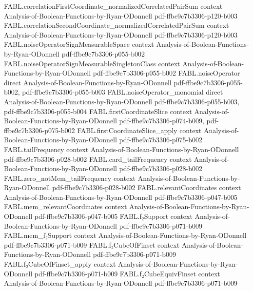 \begin{theorem}
\proofstep
  {FABL.correlationFirstCoordinate_normalizedCorrelatedPairSum}
  {context}
  {Analysis-of-Boolean-Functions-by-Ryan-ODonnell}
  {pdf-ffbe9c7b3306-p120-b003}
\proofstep
  {FABL.correlationSecondCoordinate_normalizedCorrelatedPairSum}
  {context}
  {Analysis-of-Boolean-Functions-by-Ryan-ODonnell}
  {pdf-ffbe9c7b3306-p120-b003}
\proofstep
  {FABL.noiseOperatorSignMeasurableSpace}
  {context}
  {Analysis-of-Boolean-Functions-by-Ryan-ODonnell}
  {pdf-ffbe9c7b3306-p055-b002}
\proofstep
  {FABL.noiseOperatorSignMeasurableSingletonClass}
  {context}
  {Analysis-of-Boolean-Functions-by-Ryan-ODonnell}
  {pdf-ffbe9c7b3306-p055-b002}
\proofstep
  {FABL.noiseOperator}
  {direct}
  {Analysis-of-Boolean-Functions-by-Ryan-ODonnell}
  {pdf-ffbe9c7b3306-p055-b002,
    pdf-ffbe9c7b3306-p055-b003}
\proofstep
  {FABL.noiseOperator_monomial}
  {direct}
  {Analysis-of-Boolean-Functions-by-Ryan-ODonnell}
  {pdf-ffbe9c7b3306-p055-b003,
    pdf-ffbe9c7b3306-p055-b004}
\proofstep
  {FABL.firstCoordinateSlice}
  {context}
  {Analysis-of-Boolean-Functions-by-Ryan-ODonnell}
  {pdf-ffbe9c7b3306-p074-b009,
    pdf-ffbe9c7b3306-p075-b002}
\proofstep
  {FABL.firstCoordinateSlice_apply}
  {context}
  {Analysis-of-Boolean-Functions-by-Ryan-ODonnell}
  {pdf-ffbe9c7b3306-p075-b002}
\proofstep
  {FABL.tailFrequency}
  {context}
  {Analysis-of-Boolean-Functions-by-Ryan-ODonnell}
  {pdf-ffbe9c7b3306-p028-b002}
\proofstep
  {FABL.card_tailFrequency}
  {context}
  {Analysis-of-Boolean-Functions-by-Ryan-ODonnell}
  {pdf-ffbe9c7b3306-p028-b002}
\proofstep
  {FABL.zero_notMem_tailFrequency}
  {context}
  {Analysis-of-Boolean-Functions-by-Ryan-ODonnell}
  {pdf-ffbe9c7b3306-p028-b002}
\proofstep
  {FABL.relevantCoordinates}
  {context}
  {Analysis-of-Boolean-Functions-by-Ryan-ODonnell}
  {pdf-ffbe9c7b3306-p047-b005}
\proofstep
  {FABL.mem_relevantCoordinates}
  {context}
  {Analysis-of-Boolean-Functions-by-Ryan-ODonnell}
  {pdf-ffbe9c7b3306-p047-b005}
\proofstep
  {FABL.f₂Support}
  {context}
  {Analysis-of-Boolean-Functions-by-Ryan-ODonnell}
  {pdf-ffbe9c7b3306-p071-b009}
\proofstep
  {FABL.mem_f₂Support}
  {context}
  {Analysis-of-Boolean-Functions-by-Ryan-ODonnell}
  {pdf-ffbe9c7b3306-p071-b009}
\proofstep
  {FABL.f₂CubeOfFinset}
  {context}
  {Analysis-of-Boolean-Functions-by-Ryan-ODonnell}
  {pdf-ffbe9c7b3306-p071-b009}
\proofstep
  {FABL.f₂CubeOfFinset_apply}
  {context}
  {Analysis-of-Boolean-Functions-by-Ryan-ODonnell}
  {pdf-ffbe9c7b3306-p071-b009}
\proofstep
  {FABL.f₂CubeEquivFinset}
  {context}
  {Analysis-of-Boolean-Functions-by-Ryan-ODonnell}
  {pdf-ffbe9c7b3306-p071-b009}
\proofstep

\end{theorem}
